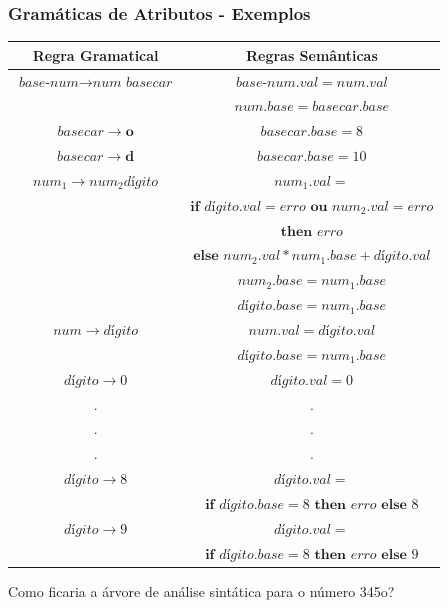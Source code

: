 \documentclass[table]{beamer}
\begin{document}
\begin{frame}
   \frametitle{Gramáticas de Atributos - Exemplos}
   \scriptsize
   \begin{table}
      \begin{tabular}{cc}
      Regra Gramatical & Regras Semânticas \\
      \hline 
      $\textit{base-num} \to \textit{num basecar}$ & $\textit{base-num}.val = num.val$ \\
                                                   & $num.base = basecar.base$         \\
      $basecar \to \textbf{o}$                     & $basecar.base = 8$                \\
      $basecar \to \textbf{d}$                     & $basecar.base = 10$               \\
      $num_{1} \to num_{2}\textit{dígito}$         & $num_{1}.val  =$                  \\
                                                   & $\textbf{if } \textit{dígito}.val = erro \textbf{ ou } \textit{num}_{2}.val = erro $  \\
                                                   & $\textbf{then } erro$ \\
                                                   & $\textbf{else } num_{2}.val*num_{1}.base+\textit{dígito}.val$ \\
                                                   & $num_{2}.base = num_{1}.base$ \\
                                                   & $\textit{dígito}.base = num_{1}.base$ \\
      $num \to \textit{dígito}$                    & $num.val = \textit{dígito}.val$ \\
                                                   & $\textit{dígito}.base = num_{1}.base$ \\
      $\textit{dígito}\to0$                        & $\textit{dígito}.val = 0$ \\
      . & . \\
      . & . \\
      . & . \\
      $\textit{dígito}\to8$                        & $\textit{dígito}.val =$ \\
                                                   & $\textbf{if } \textit{dígito}.base = 8 \textbf{ then } erro \textbf{ else } 8$ \\
      $\textit{dígito}\to9$                        & $\textit{dígito}.val =$ \\
                                                   & $\textbf{if } \textit{dígito}.base = 8 \textbf{ then } erro \textbf{ else } 9$ \\
 
      \hline
      \end{tabular}
   \end{table}
   Como ficaria a árvore de análise sintática para o número 345o?
\end{frame}
\end{document}
